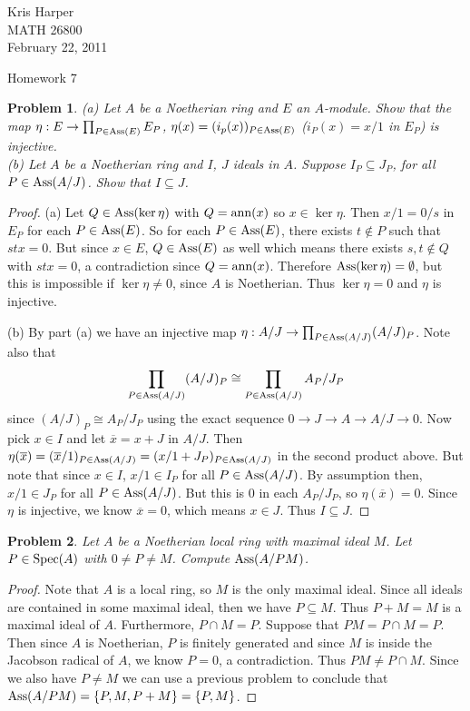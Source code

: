 \documentclass{article}
\newcommand{\ass}{\textup{Ass}}
\newcommand{\ann}{\textup{ann}}
\newcommand{\spec}{\textup{Spec}}
\newtheorem{problem}{Problem}
\begin{document}
\begin{flushright}
Kris Harper\\

MATH 26800\\

February 22, 2011
\end{flushright}

\begin{center}
Homework 7
\end{center}

\begin{problem}
(a) Let $A$ be a Noetherian ring and $E$ an $A$-module. Show that the map $\eta : E \to \prod_{P \in \ass(E)} E_P$, $\eta(x) = (i_p(x))_{P \in \ass(E)}$ ($i_P(x) = x/1$ in $E_P$) is injective.\\
(b) Let $A$ be a Noetherian ring and $I$, $J$ ideals in $A$. Suppose $I_P \subseteq J_P$, for all $P \in \ass(A/J)$. Show that $I \subseteq J$.
\end{problem}
\begin{proof}
(a) Let $Q \in \ass(\ker \eta)$ with $Q = \ann(x)$ so $x \in \ker \eta$. Then $x/1 = 0/s$ in $E_P$ for each $P \in \ass(E)$. So for each $P \in \ass(E)$, there exists $t \notin P$ such that $stx = 0$. But since $x \in E$, $Q \in \ass(E)$ as well which means there exists $s,t \notin Q$ with $stx = 0$, a contradiction since $Q = \ann(x)$. Therefore $\ass(\ker \eta) = \emptyset$, but this is impossible if $\ker \eta \neq 0$, since $A$ is Noetherian. Thus $\ker \eta = 0$ and $\eta$ is injective.

(b) By part (a) we have an injective map $\eta : A/J \to \prod_{P \in \ass(A/J)} (A/J)_P$. Note also that
\[
\prod_{P \in \ass(A/J)} (A/J)_P \cong \prod_{P \in \ass(A/J)} A_P/J_P
\]
since $(A/J)_P \cong A_P/J_P$ using the exact sequence $0 \to J \to A \to A/J \to 0$. Now pick $x \in I$ and let $\overline{x} = x + J$ in $A/J$. Then $\eta(\overline{x}) = (\overline{x}/1)_{P \in \ass(A/J)} = (x/1 + J_P)_{P \in \ass(A/J)}$ in the second product above. But note that since $x \in I$, $x/1 \in I_P$ for all $P \in \ass(A/J)$. By assumption then, $x/1 \in J_P$ for all $P \in \ass(A/J)$. But this is $0$ in each $A_P/J_P$, so $\eta(\overline{x}) = 0$. Since $\eta$ is injective, we know $\overline{x} = 0$, which means $x \in J$. Thus $I \subseteq J$.
\end{proof}

\begin{problem}
Let $A$ be a Noetherian local ring with maximal ideal $M$. Let $P \in \spec(A)$ with $0 \neq P \neq M$. Compute $\ass(A/PM)$.
\end{problem}
\begin{proof}
Note that $A$ is a local ring, so $M$ is the only maximal ideal. Since all ideals are contained in some maximal ideal, then we have $P \subseteq M$. Thus $P + M = M$ is a maximal ideal of $A$. Furthermore, $P \cap M = P$. Suppose that $PM = P \cap M = P$. Then since $A$ is Noetherian, $P$ is finitely generated and since $M$ is inside the Jacobson radical of $A$, we know $P = 0$, a contradiction. Thus $PM \neq P \cap M$. Since we also have $P \neq M$ we can use a previous problem to conclude that $\ass(A/PM) = \{P, M, P+M\} = \{P, M\}$.
\end{proof}
\end{document}
